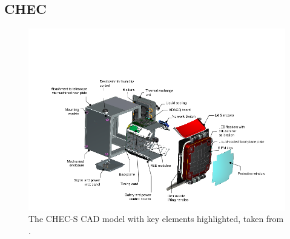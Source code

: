 \subsection{CHEC}
\begin{figure}[ht] 
        \centering \includegraphics[width=\columnwidth]{figures/cam.png}
        \caption{
                \label{fig:cam} %
                The CHEC-S CAD model with key elements highlighted, taken from \cite{rwhite}.
        }
\end{figure}
